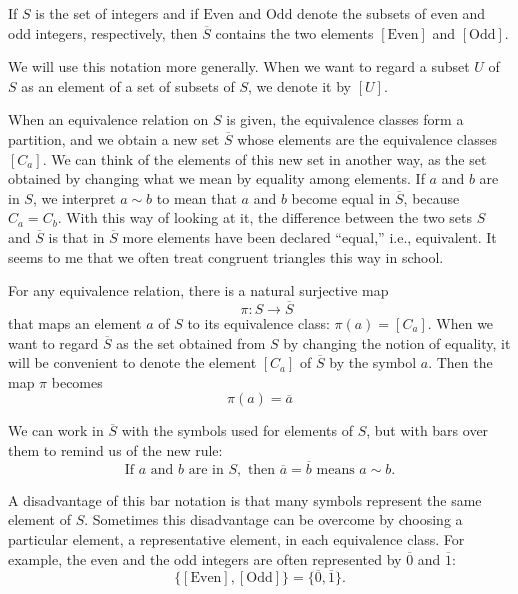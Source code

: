 \documentclass[
]{book}
\begin{document}
\leavevmode{}%
If \(S\) is the set of integers and if \(\text{Even}\) and
\(\text{Odd}\) denote the subsets of even and odd integers,
respectively, then \(\overline{S}\) contains the two elements
\([\text{Even}]\) and \([\text{Odd}]\).

We will use this notation more generally. When we want to regard a
subset \(U\) of \(S\) as an element of a set of subsets of \(S\), we
denote it by \([U]\).

When an equivalence relation on \(S\) is given, the equivalence classes
form a partition, and we obtain a new set \(\overline{S}\) whose
elements are the equivalence classes \([C_a]\). We can think of the
elements of this new set in another way, as the set obtained by changing
what we mean by equality among elements. If \(a\) and \(b\) are in
\(S\), we interpret \(a \sim b\) to mean that \(a\) and \(b\) become
equal in \(\overline{S}\), because \(C_a = C_b\). With this way of
looking at it, the difference between the two sets \(S\) and
\(\overline{S}\) is that in \(\overline{S}\) more elements have been
declared ``equal,'' i.e., equivalent. It seems to me that we often treat
congruent triangles this way in school.

For any equivalence relation, there is a natural surjective map
\begin{equation}
 \quad \pi : S \to \overline{S}
\end{equation} that maps an element \(a\) of \(S\) to its equivalence
class: \(\pi(a) = [C_a]\). When we want to regard \(\overline{S}\) as
the set obtained from \(S\) by changing the notion of equality, it will
be convenient to denote the element \([C_a]\) of \(\overline{S}\) by the
symbol \(a\). Then the map \(\pi\) becomes \begin{equation}
\pi(a) = \overline{a}
\end{equation}

We can work in \(\overline{S}\) with the symbols used for elements of
\(S\), but with bars over them to remind us of the new rule:
\begin{equation}
\text{If } a \text{ and } b \text{ are in } S, \text{ then } \overline{a} = \overline{b} \text{ means } a \sim b.
\end{equation}

A disadvantage of this bar notation is that many symbols represent the
same element of \(S\). Sometimes this disadvantage can be overcome by
choosing a particular element, a representative element, in each
equivalence class. For example, the even and the odd integers are often
represented by \(\overline{0}\) and \(\overline{1}\): \begin{equation}
\{[\text{Even}], [\text{Odd}]\} = \{ \overline{0}, \overline{1}\}.
\end{equation}
\end{document}
